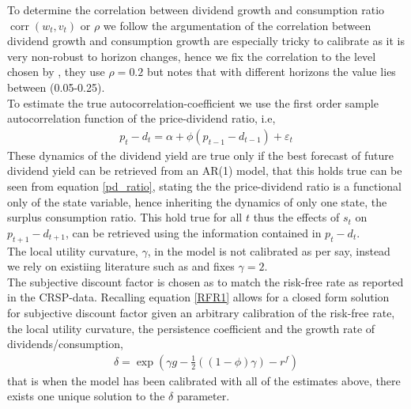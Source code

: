 To determine the correlation between dividend growth and consumption ratio ${\operatorname{corr}(w_t, v_t)}$ or $\rho$ we follow the argumentation of \citet{Campbell1999} the correlation between dividend growth and consumption growth are especially tricky to calibrate as it is very non-robust to horizon changes, hence we fix the correlation to the level chosen by \citet{Campbell1999}, they use $\rho = 0.2$ but notes that with different horizons the value lies between (0.05-0.25).\\
To estimate the true autocorrelation-coefficient we use the first order sample autocorrelation function of the price-dividend ratio, i.e,
\begin{align}
    p_t - d_t = \alpha + \phi \left( p_{t-1} - d_{t-1} \right)+\varepsilon_t
\end{align}
These dynamics of the dividend yield are true only if the best forecast of future dividend yield can be retrieved from an AR(1) model, that this holds true can be seen from equation \eqref{pd_ratio}, stating the the price-dividend ratio is a functional only of the state variable, hence inheriting the dynamics of only one state, the surplus consumption ratio. This hold true for all $t$ thus the effects of $s_t$ on $p_{t+1}-d_{t+1}$, can be retrieved using the information contained in $p_t-d_t$.\\
The local utility curvature, $\gamma$, in the model is not calibrated as per say, instead we rely on existiing literature such as \citet{Campbell1999} and fixes $\gamma = 2$.
\\
\newline
The subjective discount factor is chosen as to match the risk-free rate as reported in the CRSP-data. 
Recalling equation \eqref{RFR1} allows for a closed form solution for subjective discount factor given an arbitrary calibration of the risk-free rate, the local utility curvature, the persistence coefficient and the growth rate of dividends/consumption,
\begin{align}
    \delta = \exp{\left( \gamma g - \frac{1}{2} \left( \left(1-\phi\right)\gamma  \right) - r^{f} \right)}
\end{align}
that is when the model has been calibrated with all of the estimates above, there exists one unique solution to the $\delta$ parameter.